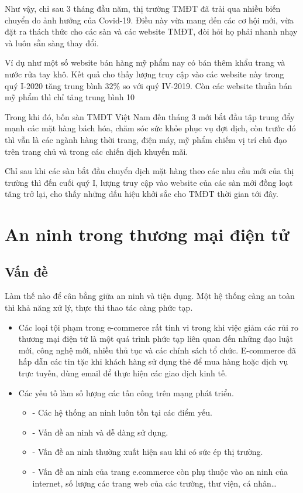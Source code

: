 \documentclass[12pt]{article}
\begin{document}
\begin{itemize}
Như vậy, chỉ sau 3 tháng đầu năm, thị trường TMĐT đã trải qua nhiều biến chuyển do ảnh hưởng của Covid-19. Điều này vừa mang đến các cơ hội mới, vừa đặt ra thách thức cho các sàn và các website TMĐT, đòi hỏi họ phải nhanh nhạy và luôn sẵn sàng thay đổi.

Ví dụ như một số website bán hàng mỹ phẩm nay có bán thêm khẩu trang và nước rửa tay khô. Kết quả cho thấy lượng truy cập vào các website này trong quý I-2020 tăng trung bình 32\% so với quý IV-2019. Còn các website thuần bán mỹ phẩm thì chỉ tăng trung bình 10%

Trong khi đó, bốn sàn TMĐT Việt Nam đến tháng 3 mới bắt đầu tập trung đẩy mạnh các mặt hàng bách hóa, chăm sóc sức khỏe phục vụ đợt dịch, còn trước đó thì vẫn là các ngành hàng thời trang, điện máy, mỹ phẩm chiếm vị trí chủ đạo trên trang chủ và trong các chiến dịch khuyến mãi.

Chỉ sau khi các sàn bắt đầu chuyển dịch mặt hàng theo các nhu cầu mới của thị trường thì đến cuối quý I, lượng truy cập vào website của các sàn mới đồng loạt tăng trở lại, cho thấy những dấu hiệu khởi sắc cho TMĐT thời gian tới đây.
\end{itemize}

\section{An ninh trong thương mại điện tử}
\subsection{Vấn đề}

Làm thế nào để cân bằng giữa an ninh và tiện dụng. Một hệ thống càng an toàn thì khả năng xử lý, thực thi thao tác càng phức tạp.

\begin{itemize}
    \item Các loại tội phạm trong e-commerce rất tinh vi trong khi việc giảm các rủi ro thương mại điện tử là một quá trình phức tạp liên quan đến những đạo luật mới, công nghệ mới, nhiều thủ tục và các chính sách tổ chức. E-commerce đã hấp dẫn các tin tặc khi khách hàng sử dụng thẻ để mua hàng hoặc dịch vụ trực tuyến, dùng email để thực hiện các giao dịch kinh tế.
    \item  Các yếu tố làm số lượng các tấn công trên mạng phát triển.
    \begin{itemize}
        \item - Các hệ thống an ninh luôn tồn tại các điểm yếu. 
        \item - Vấn đề an ninh và dễ dàng sử dụng.
        \item - Vấn đề an ninh thường xuất hiện sau khi có sức ép thị trường.
        \item - Vấn đề an ninh của trang e.commerce còn phụ thuộc vào an ninh của internet, số lượng các trang web của các trường, thư viện, cá nhân…
    \end{itemize}
\end{itemize}
\end{document}
